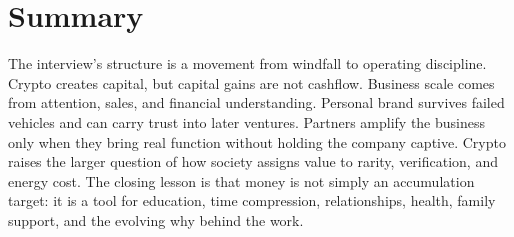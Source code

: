 \section{Summary}

The interview's structure is a movement from windfall to operating discipline. Crypto creates capital, but capital gains are not cashflow. Business scale comes from attention, sales, and financial understanding. Personal brand survives failed vehicles and can carry trust into later ventures. Partners amplify the business only when they bring real function without holding the company captive. Crypto raises the larger question of how society assigns value to rarity, verification, and energy cost. The closing lesson is that money is not simply an accumulation target: it is a tool for education, time compression, relationships, health, family support, and the evolving why behind the work.